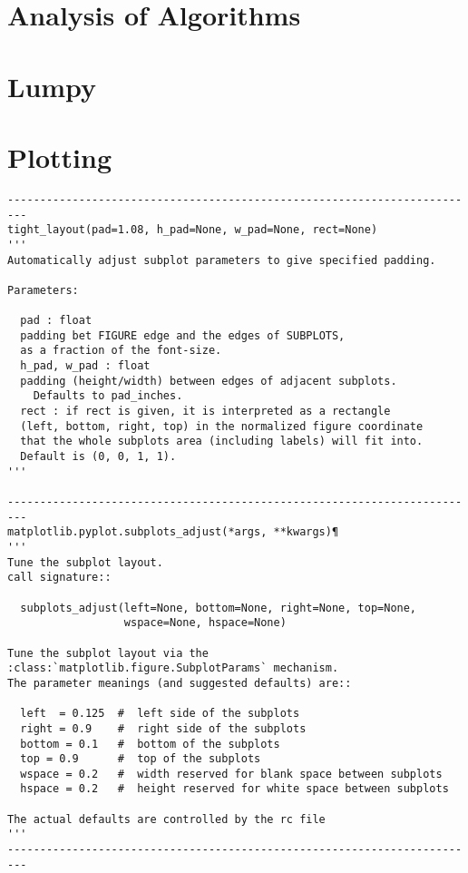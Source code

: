 \documentclass{article}
\begin{document}
\section{Analysis of Algorithms}
\newpage%
\section{Lumpy}

\section{Plotting}
\begin{verbatim}
-------------------------------------------------------------------------
tight_layout(pad=1.08, h_pad=None, w_pad=None, rect=None)
'''
Automatically adjust subplot parameters to give specified padding.

Parameters:

  pad : float
  padding bet FIGURE edge and the edges of SUBPLOTS,
  as a fraction of the font-size.
  h_pad, w_pad : float
  padding (height/width) between edges of adjacent subplots.
    Defaults to pad_inches.
  rect : if rect is given, it is interpreted as a rectangle
  (left, bottom, right, top) in the normalized figure coordinate
  that the whole subplots area (including labels) will fit into.
  Default is (0, 0, 1, 1).
'''

-------------------------------------------------------------------------
matplotlib.pyplot.subplots_adjust(*args, **kwargs)¶
'''
Tune the subplot layout.
call signature::

  subplots_adjust(left=None, bottom=None, right=None, top=None,
                  wspace=None, hspace=None)

Tune the subplot layout via the
:class:`matplotlib.figure.SubplotParams` mechanism.
The parameter meanings (and suggested defaults) are::

  left  = 0.125  #  left side of the subplots
  right = 0.9    #  right side of the subplots
  bottom = 0.1   #  bottom of the subplots
  top = 0.9      #  top of the subplots
  wspace = 0.2   #  width reserved for blank space between subplots
  hspace = 0.2   #  height reserved for white space between subplots

The actual defaults are controlled by the rc file
'''
-------------------------------------------------------------------------
\end{verbatim}
\end{document}
